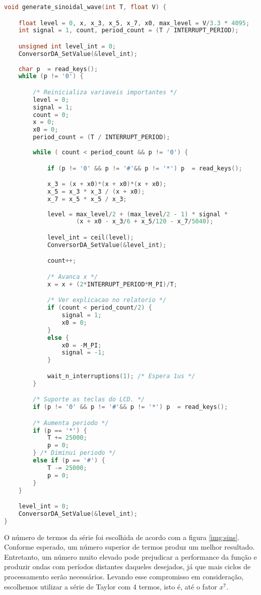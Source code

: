 \begin{lstlisting}[caption= Função de geração de ondas senoidais.
,language=C, numbers=none] 
void generate_sinoidal_wave(int T, float V) {

	float level = 0, x, x_3, x_5, x_7, x0, max_level = V/3.3 * 4095;
	int signal = 1, count, period_count = (T / INTERRUPT_PERIOD);

	unsigned int level_int = 0;
	ConversorDA_SetValue(&level_int);
	
	char p  = read_keys();
	while (p != '0') {

		/* Reinicializa variaveis importantes */
		level = 0;
		signal = 1;
		count = 0;
		x = 0;
		x0 = 0;
		period_count = (T / INTERRUPT_PERIOD);
		
		while ( count < period_count && p != '0') {

			if (p != '0' && p != '#'&& p != '*') p  = read_keys();

			x_3 = (x + x0)*(x + x0)*(x + x0);
			x_5 = x_3 * x_3 / (x + x0);
			x_7 = x_5 * x_5 / x_3;
			
			level = max_level/2 + (max_level/2 - 1) * signal * 
					(x + x0 - x_3/6 + x_5/120 - x_7/5040);

			level_int = ceil(level);
			ConversorDA_SetValue(&level_int);

			count++;

			/* Avanca x */
			x = x + (2*INTERRUPT_PERIOD*M_PI)/T;

			/* Ver explicacao no relatorio */
			if (count < period_count/2) {
				signal = 1;
				x0 = 0;
			}
			else {
				x0 = -M_PI;
				signal = -1;
			}

			wait_n_interruptions(1); /* Espera 1us */
		}

		/* Suporte as teclas do LCD. */
		if (p != '0' && p != '#'&& p != '*') p  = read_keys();

		/* Aumenta periodo */
		if (p == '*') {
			T += 25000;
			p = 0;
		} /* Diminui periodo */
		else if (p == '#') {
			T -= 25000;
			p = 0;
		}
	}

	level_int = 0;
	ConversorDA_SetValue(&level_int);
}
\end{lstlisting}

\vspace{12pt}

O número de termos da série foi escolhida de acordo com a figura \ref{img:sins}.
Conforme esperado, um número superior de termos produz um melhor resultado.
Entretanto, um número muito elevado pode prejudicar a performance da função e
produzir ondas com períodos distantes daqueles desejados, já que mais ciclos de
processamento serão necessários. Levando esse compromisso em consideração,
escolhemos utilizar a série de Taylor com 4 termos, isto é, até o fator \(x^7\).

